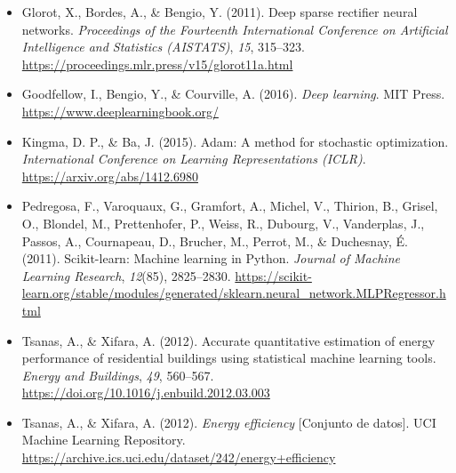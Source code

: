 \documentclass[11pt,a4paper]{article}
\begin{document}
\begin{itemize}[leftmargin=1.5em, itemsep=6pt]
    \item Glorot, X., Bordes, A., \& Bengio, Y. (2011). Deep sparse rectifier neural networks. \textit{Proceedings of the Fourteenth International Conference on Artificial Intelligence and Statistics (AISTATS)}, \textit{15}, 315--323. \url{https://proceedings.mlr.press/v15/glorot11a.html}
    \item Goodfellow, I., Bengio, Y., \& Courville, A. (2016). \textit{Deep learning}. MIT Press. \url{https://www.deeplearningbook.org/}
    \item Kingma, D. P., \& Ba, J. (2015). Adam: A method for stochastic optimization. \textit{International Conference on Learning Representations (ICLR)}. \url{https://arxiv.org/abs/1412.6980}
    \item Pedregosa, F., Varoquaux, G., Gramfort, A., Michel, V., Thirion, B., Grisel, O., Blondel, M., Prettenhofer, P., Weiss, R., Dubourg, V., Vanderplas, J., Passos, A., Cournapeau, D., Brucher, M., Perrot, M., \& Duchesnay, É. (2011). Scikit-learn: Machine learning in Python. \textit{Journal of Machine Learning Research}, \textit{12}(85), 2825--2830. \url{https://scikit-learn.org/stable/modules/generated/sklearn.neural_network.MLPRegressor.html}
    \item Tsanas, A., \& Xifara, A. (2012). Accurate quantitative estimation of energy performance of residential buildings using statistical machine learning tools. \textit{Energy and Buildings}, \textit{49}, 560--567. \url{https://doi.org/10.1016/j.enbuild.2012.03.003}
    \item Tsanas, A., \& Xifara, A. (2012). \textit{Energy efficiency} [Conjunto de datos]. UCI Machine Learning Repository. \url{https://archive.ics.uci.edu/dataset/242/energy+efficiency}
\end{itemize}
\end{document}
